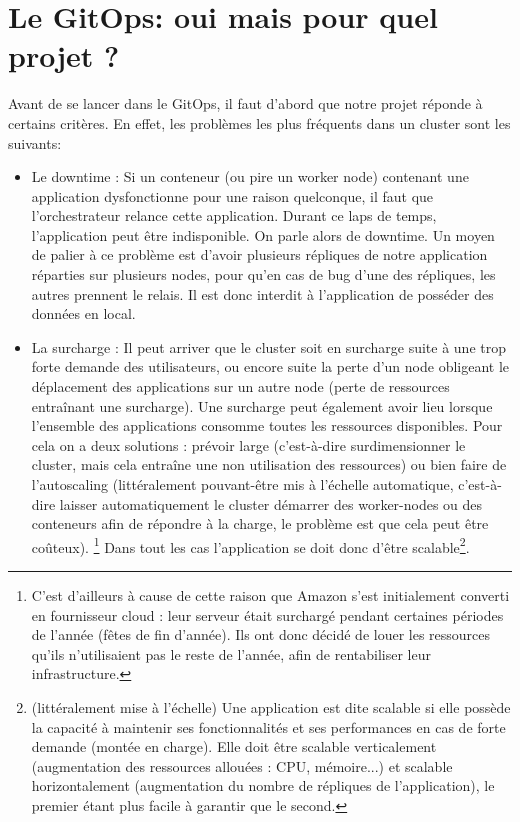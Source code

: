 \documentclass[11pt,fleqn]{book} %
\begin{document}
\section{Le GitOps: oui mais pour quel projet ?}
Avant de se lancer dans le GitOps, il faut d'abord que notre projet réponde à certains critères. En effet, les problèmes les plus fréquents dans un cluster sont les suivants: \\
\begin{itemize}
    \item Le downtime : Si un conteneur (ou pire un worker node) contenant une application dysfonctionne pour une raison quelconque, il faut que l'orchestrateur relance cette application. Durant ce laps de temps, l'application peut être indisponible. On parle alors de downtime. Un moyen de palier à ce problème est d'avoir plusieurs répliques de notre application réparties sur plusieurs nodes, pour qu'en cas de bug d'une des répliques, les autres prennent le relais. Il est donc interdit à l'application de posséder des données en local. \\
    
    \item La surcharge : Il peut arriver que le cluster soit en surcharge suite à une trop forte demande des utilisateurs, ou encore suite la perte d'un node obligeant le déplacement des applications sur un autre node (perte de ressources entraînant une surcharge). Une surcharge peut également avoir lieu lorsque l'ensemble des  applications consomme toutes les ressources disponibles. Pour cela on a deux solutions : prévoir large (c'est-à-dire surdimensionner le cluster, mais cela entraîne une non utilisation des ressources) ou bien faire de l'autoscaling (littéralement pouvant-être mis à l'échelle automatique, c'est-à-dire laisser automatiquement le cluster démarrer des worker-nodes ou des conteneurs afin de répondre à la charge, le problème est que cela peut être coûteux). \footnote{C'est d'ailleurs à cause de cette raison que Amazon s'est initialement converti en fournisseur cloud : leur serveur était surchargé pendant certaines périodes de l'année (fêtes de fin d'année). Ils ont donc décidé de louer les ressources qu'ils n'utilisaient pas le reste de l'année, afin de rentabiliser leur infrastructure.} Dans tout les cas l'application se doit donc d'être scalable\footnote{(littéralement mise à l'échelle) Une application est dite scalable si elle possède la capacité à maintenir ses fonctionnalités et ses performances en cas de forte demande (montée en charge). Elle doit être scalable verticalement (augmentation des ressources allouées :  CPU, mémoire...) et scalable horizontalement (augmentation du nombre de répliques de l'application), le premier étant plus facile à garantir que le second.}.\\


\end{itemize}
\end{document}
